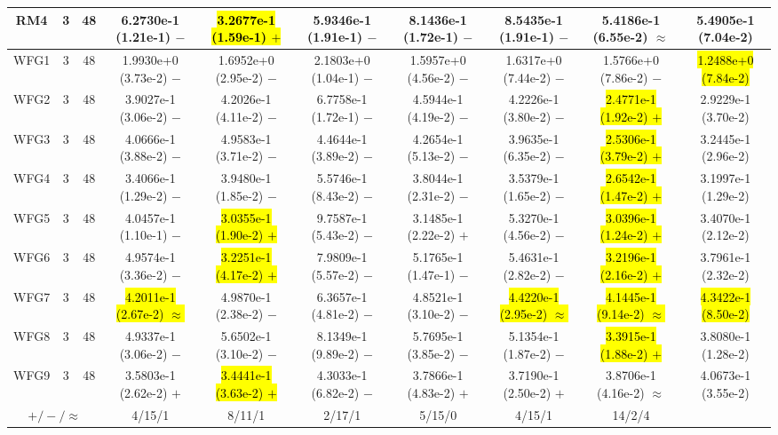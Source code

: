\documentclass[journal]{IEEEtran}
\begin{document}
\begin{table*}[htbp]
\begin{tabular}{cccccccccc}
\hline
\multirow{1}{*}{RM4}&3&48&6.2730e-1 (1.21e-1) $-$&\hl{3.2677e-1 (1.59e-1) $+$}&5.9346e-1 (1.91e-1) $-$&8.1436e-1 (1.72e-1) $-$&8.5435e-1 (1.91e-1) $-$&5.4186e-1 (6.55e-2) $\approx$&5.4905e-1 (7.04e-2)\\
\hline
\multirow{1}{*}{WFG1}&3&48&1.9930e+0 (3.73e-2) $-$&1.6952e+0 (2.95e-2) $-$&2.1803e+0 (1.04e-1) $-$&1.5957e+0 (4.56e-2) $-$&1.6317e+0 (7.44e-2) $-$&1.5766e+0 (7.86e-2) $-$&\hl{1.2488e+0 (7.84e-2)}\\
\hline
\multirow{1}{*}{WFG2}&3&48&3.9027e-1 (3.06e-2) $-$&4.2026e-1 (4.11e-2) $-$&6.7758e-1 (1.72e-1) $-$&4.5944e-1 (4.19e-2) $-$&4.2226e-1 (3.80e-2) $-$&\hl{2.4771e-1 (1.92e-2) $+$}&2.9229e-1 (3.70e-2)\\
\hline
\multirow{1}{*}{WFG3}&3&48&4.0666e-1 (3.88e-2) $-$&4.9583e-1 (3.71e-2) $-$&4.4644e-1 (3.89e-2) $-$&4.2654e-1 (5.13e-2) $-$&3.9635e-1 (6.35e-2) $-$&\hl{2.5306e-1 (3.79e-2) $+$}&3.2445e-1 (2.96e-2)\\
\hline
\multirow{1}{*}{WFG4}&3&48&3.4066e-1 (1.29e-2) $-$&3.9480e-1 (1.85e-2) $-$&5.5746e-1 (8.43e-2) $-$&3.8044e-1 (2.31e-2) $-$&3.5379e-1 (1.65e-2) $-$&\hl{2.6542e-1 (1.47e-2) $+$}&3.1997e-1 (1.29e-2)\\
\hline
\multirow{1}{*}{WFG5}&3&48&4.0457e-1 (1.10e-1) $-$&\hl{3.0355e-1 (1.90e-2) $+$}&9.7587e-1 (5.43e-2) $-$&3.1485e-1 (2.22e-2) $+$&5.3270e-1 (4.56e-2) $-$&\hl{3.0396e-1 (1.24e-2) $+$}&3.4070e-1 (2.12e-2)\\
\hline
\multirow{1}{*}{WFG6}&3&48&4.9574e-1 (3.36e-2) $-$&\hl{3.2251e-1 (4.17e-2) $+$}&7.9809e-1 (5.57e-2) $-$&5.1765e-1 (1.47e-1) $-$&5.4631e-1 (2.82e-2) $-$&\hl{3.2196e-1 (2.16e-2) $+$}&3.7961e-1 (2.32e-2)\\
\hline
\multirow{1}{*}{WFG7}&3&48&\hl{4.2011e-1 (2.67e-2) $\approx$}&4.9870e-1 (2.38e-2) $-$&6.3657e-1 (4.81e-2) $-$&4.8521e-1 (3.10e-2) $-$&\hl{4.4220e-1 (2.95e-2) $\approx$}&\hl{4.1445e-1 (9.14e-2) $\approx$}&\hl{4.3422e-1 (8.50e-2)}\\
\hline
\multirow{1}{*}{WFG8}&3&48&4.9337e-1 (3.06e-2) $-$&5.6502e-1 (3.10e-2) $-$&8.1349e-1 (9.89e-2) $-$&5.7695e-1 (3.85e-2) $-$&5.1354e-1 (1.87e-2) $-$&\hl{3.3915e-1 (1.88e-2) $+$}&3.8080e-1 (1.28e-2)\\
\hline
\multirow{1}{*}{WFG9}&3&48&3.5803e-1 (2.62e-2) $+$&\hl{3.4441e-1 (3.63e-2) $+$}&4.3033e-1 (6.82e-2) $-$&3.7866e-1 (4.83e-2) $+$&3.7190e-1 (2.50e-2) $+$&3.8706e-1 (4.16e-2) $\approx$&4.0673e-1 (3.55e-2)\\
\hline
\multicolumn{3}{c}{$+/-/\approx$}&4/15/1&8/11/1&2/17/1&5/15/0&4/15/1&14/2/4&\\
\bottomrule
\end{tabular}
\label{No Label}
\end{table*}
\end{document}
